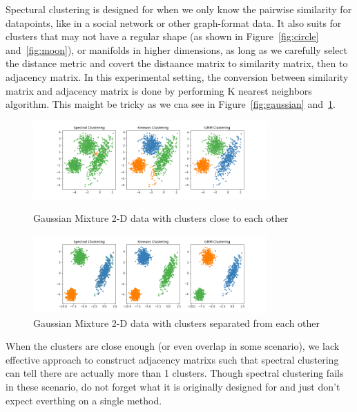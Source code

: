\documentclass[12pt,a4paper,UTF8,fntef]{article}
\begin{document}
Spectural clustering is designed for when we only know the pairwise similarity for datapoints, like in a social network or other graph-format data. It also suits for clusters that may not have a regular shape (as shown in Figure~\ref{fig:circle} and~\ref{fig:moon}), or manifolds in higher dimensions, as long as we carefully select the distance metric and covert the distaance matrix to similarity matrix, then to adjacency matrix. In this experimental setting, the conversion between similarity matrix and adjacency matrix is done by performing K nearest neighbors algorithm. This maight be tricky as we cna see in Figure~\ref{fig:gaussian} and~\ref{fig:sepagaussian}.
\begin{figure}[ht]
	\centering
	\includegraphics[width=0.8\textwidth]{figure/spectral_clustering_guassian.png}
	\caption{Gaussian Mixture 2-D data with clusters close to each other}\label{fig:gaussian}

	\includegraphics[width=0.8\textwidth]{figure/spectral_clustering_separatedguassian.png}
	\caption{Gaussian Mixture 2-D data with clusters separated from each other}\label{fig:sepagaussian}
\end{figure}

When the clusters are close enough (or even overlap in some scenario), we lack effective approach to construct adjacency matrixs such that spectral clustering can tell there are actually more than 1 clusters. Though spectral clustering fails in these scenario, do not forget what it is originally designed for and just don't expect everthing on a single method. 
\end{document}
